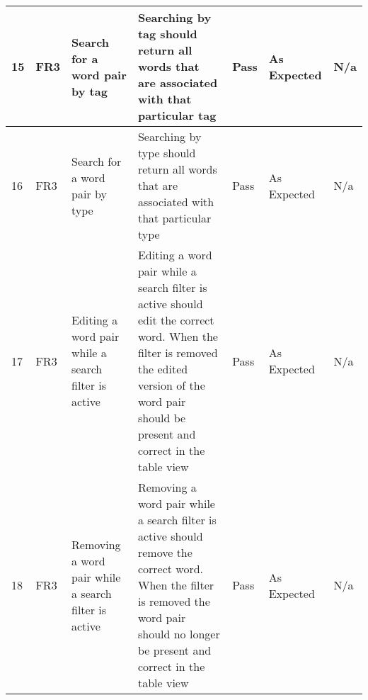 \documentclass[paper=a4, fontsize=11pt]{scrartcl}	%
\numberwithin{equation}{section}															%
\numberwithin{figure}{section}																%
\numberwithin{table}{section}
\begin{document}
\begin{landscape}
\begin{longtable}{|l|p{2cm}|p{5cm}|p{5cm}|l|p{5cm}|p{5cm}|}
15 & FR3                    & Search for a word pair by tag                        & Searching by tag should return all words that are associated with that particular tag                                                                                                                                                      & Pass      & As Expected                                        & N/a                                                                                                                                                                                                                        \\ \hline
16 & FR3                    & Search for a word pair by type                       & Searching by type should return all words that are associated with that particular type                                                                                                                                                    & Pass      & As Expected                                        & N/a                                                                                                                                                                                                                        \\ \hline
17 & FR3                    & Editing a word pair while a search filter is active  & Editing a word pair while a search filter is active should edit the correct word. When the filter is removed the edited version of the word pair should be present and correct in the table view                                           & Pass      & As Expected                                        & N/a                                                                                                                                                                                                                        \\ \hline
18 & FR3                    & Removing a word pair while a search filter is active & Removing a word pair while a search filter is active should remove the correct word. When the filter is removed the word pair should no longer be present and correct in the table view                                                    & Pass      & As Expected                                        & N/a                                                                                                                                                                                                                        \\ \hline

\end{longtable}
\end{landscape}
\end{document}
